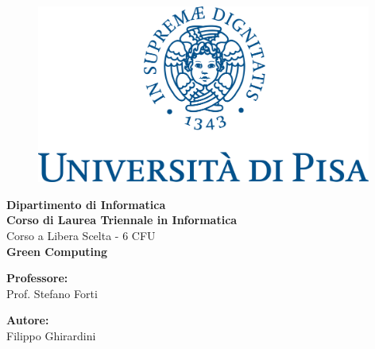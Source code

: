 \begin{titlepage} %
	\begin{figure}[t] %
		\centering\includegraphics[width=0.98\textwidth]{marchio_unipi_pant541.png}
	\end{figure}
	\vspace{20mm}
	
	\begin{Large}
		\begin{center}
			\textbf{Dipartimento di Informatica\\ Corso di Laurea Triennale in Informatica\\}
			\vspace{20mm}
			{\LARGE{Corso a Libera Scelta - 6 CFU}}\\
			\vspace{10mm}
			{\huge{\bf Green Computing}}\\
		\end{center}
	\end{Large}
	
	
	\vspace{36mm}
	\begin{minipage}[t]{0.47\textwidth}
		{\large{\bf Professore:}\\ \large{Prof. Stefano Forti}}
	\end{minipage}
	\hfill
	\begin{minipage}[t]{0.47\textwidth}\raggedleft
		{\large{\bf Autore:}\\ \large{Filippo Ghirardini}}
	\end{minipage}
	
	\vspace{25mm}
	
	\hrulefill
	
	\vspace{5mm}
	
	
\end{titlepage}